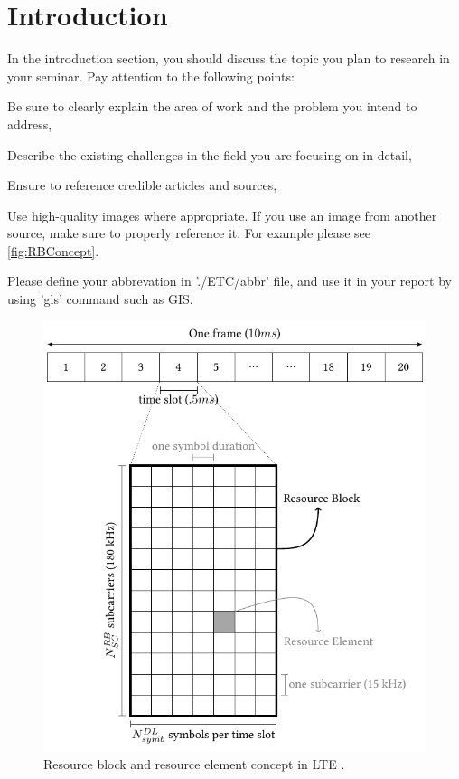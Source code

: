 \chapter{Introduction}
\label{chap:Introduction}

In the introduction section, you should discuss the topic you plan to research in your seminar. Pay attention to the following points:
\begin{dinglist}{52}
\item Be sure to clearly explain the area of work and the problem you intend to address,
\item Describe the existing challenges in the field you are focusing on in detail,
\item Ensure to reference credible articles and sources,
\item Use high-quality images where appropriate. If you use an image from another source, make sure to properly reference it. For example please see \autoref{fig:RBConcept}.
\item Please define your abbrevation in './ETC/abbr'  file, and use it in your report by using  'gls' command such as \gls{GIS}.
\end{dinglist}
\begin{figure}
\centering
\includegraphics[width=0.6\linewidth]{./Pic/RBConcept/mainFig}
\caption{%
Resource block and resource element concept in LTE \cite[Fig. 3.2.3]{Rumney2013LTE}.}
\label{fig:RBConcept}
\end{figure}

